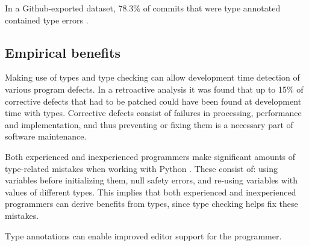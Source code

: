 In a Github-exported dataset, 78.3\% of commits that were type annotated contained type errors \cite{di_grazia_evolution_2022}. 


\subsection{Empirical benefits}

Making use of types and type checking can allow development time detection of various program defects. In a retroactive analysis it was found that up to 15\% of corrective defects that had to be patched could have been found at development time with types\cite{khan_empirical_2022}. Corrective defects consist of failures in processing, performance and implementation, and thus preventing or fixing them is a necessary part of software maintenance.

Both experienced and inexperienced programmers make significant amounts of type-related mistakes when working with Python \cite{khan_empirical_2022}. These consist of: using variables before initializing them, null safety errors, and re-using variables with values of different types. This implies that both experienced and inexperienced programmers can derive benefits from types, since type checking helps fix these mistakes.


Type annotations can enable improved editor support for the programmer.



